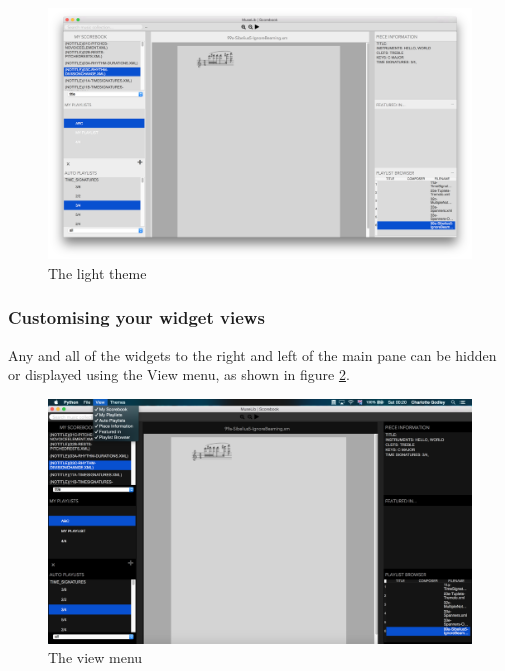 \begin{figure}[H]
\centering
\includegraphics[width=400pt]{main_light}
\caption{The light theme}
\label{fig:theme2}	
\end{figure}

\subsubsection{Customising your widget views}
Any and all of the widgets to the right and left of the main pane can be hidden or displayed using the View menu, as shown in figure \ref{fig:view}.

\begin{figure}[H]
\centering
\includegraphics[width=500pt]{view}
\caption{The view menu}
\label{fig:view}	
\end{figure}


